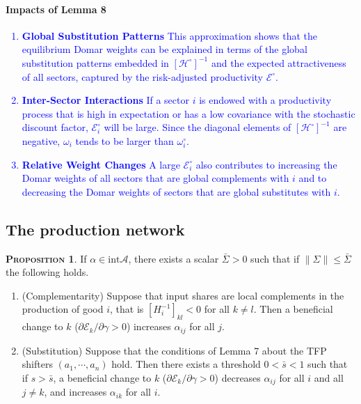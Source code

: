 \documentclass[11pt]{article}
\theoremstyle{definition}
\newtheorem{prop}{\noindent \textbf{\textsc{Proposition}}}
\begin{document}
	\paragraph{Impacts of Lemma 8}
	\textcolor{blue}{\begin{enumerate}[leftmargin=1cm, label=\arabic*.]
		\item \textbf{Global Substitution Patterns} This approximation shows that the equilibrium Domar weights can be explained in terms of the global substitution patterns embedded in \( [ \mathcal{H}^\circ]^{-1} \) and the expected attractiveness of all sectors, captured by the risk-adjusted productivity \(  \mathcal{E}^\circ \).
		\item \textbf{Inter-Sector Interactions} If a sector \( i \) is endowed with a productivity process that is high in expectation or has a low covariance with the stochastic discount factor, \(  \mathcal{E}^\circ_i \) will be large. Since the diagonal elements of \( [ \mathcal{H}^\circ]^{-1} \) are negative, \( \omega_i \) tends to be larger than \( \omega^\circ_i \).
		\item \textbf{Relative Weight Changes} A large \( \mathcal{E}^\circ_i \) also contributes to increasing the Domar weights of all sectors that are global complements with \( i \) and to decreasing the Domar weights of sectors that are global substitutes with \( i \).
	\end{enumerate}}

	
	\subsection{The production network}
	\begin{prop}
		If $\alpha\in\text{int}\mathcal{A}$, there exists a scalar $\bar{\Sigma}>0$ such that if $\|\Sigma\|\leqslant\bar{\Sigma}$ the following holds.
		\begin{enumerate}[leftmargin=1cm, label=\arabic*.]
			\item (Complementarity) Suppose that input shares are local complements in the production of good $i$, that is $[H_i^{-1}]_{kl} < 0$ for all $k\neq l$. Then a beneficial change to $k$ ($\partial \mathcal{E}_k / \partial \gamma > 0$) increases $\alpha_{ij}$ for all $j$.
			\item (Substitution) Suppose that the conditions of Lemma 7 about the TFP shifters $(a_1,\cdots,a_n)$ hold. Then there exists a threshold $0<\bar{s}<1$ such that if $s > \bar{s}$, a beneficial change to $k$ ($\partial \mathcal{E}_k / \partial \gamma > 0$) decreases $\alpha_{ij}$ for all $i$ and all $j \neq k$, and increases $\alpha_{ik}$ for all $i$.
		\end{enumerate}
	\end{prop}
	
\end{document}
